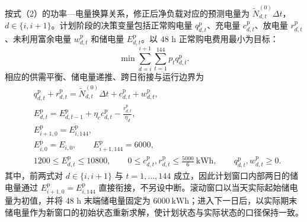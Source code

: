 \documentclass[12pt,a4paper]{ctexart}
\begin{document}
\par\noindent\hspace*{2em}按式（2）的功率—电量换算关系，修正后净负载对应的预测电量为 $\widetilde{N}_{d,t}^{(0)}\Delta t$，$d\in\{i,i+1\}$。计划阶段的决策变量包括正常购电量 $q_{d,t}^{\mathrm{p}}$、充电量 $c_{d,t}^{\mathrm{p}}$、放电量 $r_{d,t}^{\mathrm{p}}$、未利用富余电量 $w_{d,t}^{\mathrm{p}}$ 和储电量 $E_{d,t}^{\mathrm{p}}$。以 48 h 正常购电费用最小为目标：
\begin{equation}
\min\sum_{d=i}^{i+1}\sum_{t=1}^{144}p_tq_{d,t}^{\mathrm{p}}.
\end{equation}
相应的供需平衡、储电量递推、跨日衔接与运行边界为
\begin{equation}
\begin{aligned}
&q_{d,t}^{\mathrm{p}}+r_{d,t}^{\mathrm{p}}=\widetilde{N}_{d,t}^{(0)}\Delta t+c_{d,t}^{\mathrm{p}}+w_{d,t}^{\mathrm{p}},\\
&E_{d,t}^{\mathrm{p}}=E_{d,t-1}^{\mathrm{p}}+\eta_c c_{d,t}^{\mathrm{p}}-\frac{r_{d,t}^{\mathrm{p}}}{\eta_d},\\
&E_{i+1,0}^{\mathrm{p}}=E_{i,144}^{\mathrm{p}},\\
&E_{i,0}^{\mathrm{p}}=E_{i,0},\qquad E_{i+1,144}^{\mathrm{p}}=6000,\\
&1200\leq E_{d,t}^{\mathrm{p}}\leq10800,\qquad 0\leq c_{d,t}^{\mathrm{p}},r_{d,t}^{\mathrm{p}}\leq\frac{5000}{6}\ \mathrm{kWh},\qquad q_{d,t}^{\mathrm{p}},w_{d,t}^{\mathrm{p}}\geq0.
\end{aligned}
\end{equation}
其中，前两式对 $d\in\{i,i+1\}$ 与 $t=1,\ldots,144$ 成立，因此计划窗口内部两日的储电量通过 $E_{i+1,0}^{\mathrm{p}}=E_{i,144}^{\mathrm{p}}$ 直接衔接，不另设中断。滚动窗口以当天实际起始储电量为初值，并将 48 h 末端储电量固定为 $6000\ \mathrm{kWh}$；进入下一日后，以实际期末储电量作为新窗口的初始状态重新求解，使计划状态与实际状态的口径保持一致。
\end{document}
